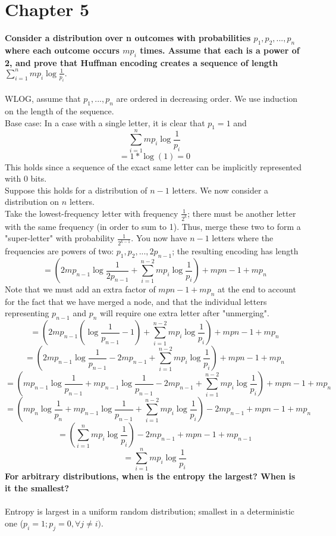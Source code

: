 \section{Chapter 5}
 
\begin{problem}{5.16}
\textbf{Consider a distribution over n outcomes with probabilities $p_1, p_2, ..., p_n$ where each outcome occurs $mp_i$ times. Assume that each is a power of 2, and prove that Huffman encoding creates a sequence of length $\sum_{i=1}^{n}mp_i \log \frac{1}{p_i}.$}
\\
\\
WLOG, assume that $p_1, ..., p_n$ are ordered in decreasing order. We use induction on the length of the sequence.
\\
Base case: In a case with a single letter, it is clear that $p_1 = 1$ and 
\[
    \sum_{i=1}^{n}mp_i \log \frac{1}{p_i}
\]
\[
    = 1 * \log(1) = 0
\]
This holds since a sequence of the exact same letter can be implicitly represented with 0 bits.
\\
Suppose this holds for a distribution of $n - 1$ letters. We now consider a distribution on $n$ letters.
\\
Take the lowest-frequency letter with frequency $\frac{1}{2^{k}}$; there must be another letter with the same frequency (in order to sum to 1). Thus, merge these two to form a "super-letter" with probability $\frac{1}{2^{k - 1}}$. You now have $n - 1$ letters where the frequencies are powers of two: $p_1, p_2, ..., 2p_{n - 1}$; the resulting encoding has length 
\[
    = (2mp_{n - 1} \log \frac{1}{2p_{n - 1}} + \sum_{i=1}^{n - 2}mp_i \log \frac{1}{p_i}) + mp{n - 1} + mp_{n}
\]
Note that we must add an extra factor of $mp{n - 1} + mp_{n}$ at the end to account for the fact that we have merged a node, and that the individual letters representing $p_{n - 1}$ and $p_n$ will require one extra letter after "unmerging".
\[
    = (2mp_{n - 1} (\log \frac{1}{p_{n - 1}} - 1) + \sum_{i=1}^{n - 2}mp_i \log \frac{1}{p_i}) + mp{n - 1} + mp_{n}
\]
\[
    = (2mp_{n - 1} \log \frac{1}{p_{n - 1}} - 2mp_{n - 1} + \sum_{i=1}^{n - 2}mp_i \log \frac{1}{p_i}) + mp{n - 1} + mp_{n}
\]
\[
    = (mp_{n - 1} \log \frac{1}{p_{n - 1}} + mp_{n - 1} \log \frac{1}{p_{n - 1}} - 2mp_{n - 1} + \sum_{i=1}^{n - 2}mp_i \log \frac{1}{p_i}) + mp{n - 1} + mp_{n}
\]
\[
    = (mp_n \log \frac{1}{p_n} + mp_{n - 1} \log \frac{1}{p_{n - 1}} + \sum_{i=1}^{n - 2}mp_i \log \frac{1}{p_i}) - 2mp_{n - 1} + mp{n - 1} + mp_{n}
\]
\[
    = (\sum_{i=1}^{n}mp_i \log \frac{1}{p_i}) - 2mp_{n - 1} + mp{n - 1} + mp_{n - 1}
\]
\[
    = \sum_{i=1}^{n}mp_i \log \frac{1}{p_i}
\]
\textbf{For arbitrary distributions, when is the entropy the largest? When is it the smallest?}
\\
\\
Entropy is largest in a uniform random distribution; smallest in a deterministic one ($p_i = 1; p_j = 0, \forall j \neq i)$.
\end{problem}

